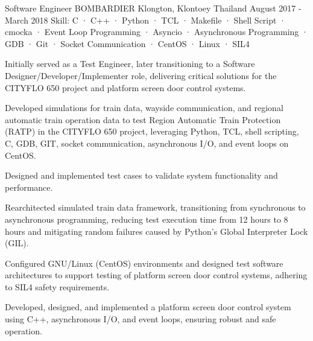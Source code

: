 \begin{cventries}
  \cventry
    {Software Engineer} %
    {BOMBARDIER} %
    {Klongton, Klontoey Thailand} %
    {August 2017 - March 2018} %
    {Skill: C · C++ · Python · TCL · Makefile · Shell Script · cmocka · Event Loop Programming · Asyncio · Asynchronous Programming · GDB · Git · Socket Communication · CentOS · Linux · SIL4} %
    {
      \begin{cvitems} %
      \item {Initially served as a Test Engineer, later transitioning to a Software Designer/Developer/Implementer role, delivering critical solutions for the CITYFLO 650 project and platform screen door control systems.}
      \item {Developed simulations for train data, wayside communication, and regional automatic train operation data to test Region Automatic Train Protection (RATP) in the CITYFLO 650 project, leveraging Python, TCL, shell scripting, C, GDB, GIT, socket communication, asynchronous I/O, and event loops on CentOS.}
      \item {Designed and implemented test cases to validate system functionality and performance.}
      \item {Rearchitected simulated train data framework, transitioning from synchronous to asynchronous programming, reducing test execution time from 12 hours to 8 hours and mitigating random failures caused by Python’s Global Interpreter Lock (GIL).}
      \item {Configured GNU/Linux (CentOS) environments and designed test software architectures to support testing of platform screen door control systems, adhering to SIL4 safety requirements.}
      \item {Developed, designed, and implemented a platform screen door control system using C++, asynchronous I/O, and event loops, ensuring robust and safe operation.}
      \end{cvitems}
    }


\end{cventries}
